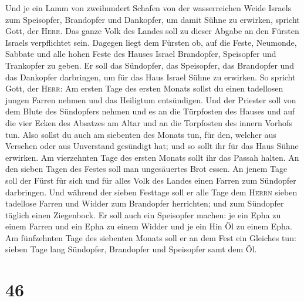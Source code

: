  Und je ein Lamm von zweihundert Schafen von der
wasserreichen Weide Israels zum Speisopfer, Brandopfer und Dankopfer, um
damit Sühne zu erwirken, spricht Gott, der \textsc{Herr}.
 Das ganze Volk des Landes soll zu dieser Abgabe an den
Fürsten Israels verpflichtet sein.  Dagegen liegt dem
Fürsten ob, auf die Feste, Neumonde, Sabbate und alle hohen Feste des
Hauses Israel Brandopfer, Speisopfer und Trankopfer zu geben. Er soll
das Sündopfer, das Speisopfer, das Brandopfer und das Dankopfer
darbringen, um für das Haus Israel Sühne zu erwirken.  So
spricht Gott, der \textsc{Herr}: Am ersten Tage des ersten Monats sollst
du einen tadellosen jungen Farren nehmen und das Heiligtum entsündigen.
 Und der Priester soll von dem Blute des Sündopfers
nehmen und es an die Türpfosten des Hauses und auf die vier Ecken des
Absatzes am Altar und an die Torpfosten des innern Vorhofs tun.
 Also sollst du auch am siebenten des Monats tun, für
den, welcher aus Versehen oder aus Unverstand gesündigt hat; und so
sollt ihr für das Haus Sühne erwirken.  Am vierzehnten
Tage des ersten Monats sollt ihr das Passah halten. An den sieben Tagen
des Festes soll man ungesäuertes Brot essen.  An jenem
Tage soll der Fürst für sich und für alles Volk des Landes einen Farren
zum Sündopfer darbringen.  Und während der sieben
Festtage soll er alle Tage dem \textsc{Herrn} sieben tadellose Farren
und Widder zum Brandopfer herrichten; und zum Sündopfer täglich einen
Ziegenbock.  Er soll auch ein Speisopfer machen: je ein
Epha zu einem Farren und ein Epha zu einem Widder und je ein Hin Öl zu
einem Epha.  Am fünfzehnten Tage des siebenten Monats
soll er an dem Fest ein Gleiches tun: sieben Tage lang Sündopfer,
Brandopfer und Speisopfer samt dem Öl.

\hypertarget{section-45}{%
\section{46}\label{section-45}}

